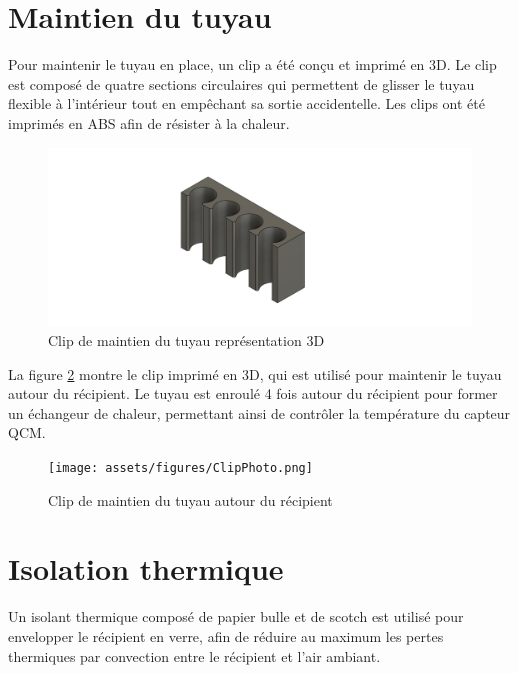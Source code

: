 \section{Maintien du tuyau}

Pour maintenir le tuyau en place, un clip a été conçu et imprimé en 3D.  
Le clip est composé de quatre sections circulaires qui permettent de glisser le tuyau flexible à l’intérieur tout en empêchant sa sortie accidentelle.  
Les clips ont été imprimés en ABS afin de résister à la chaleur.

\begin{figure}[H]
    \centering
    \includegraphics[width=\textwidth]{assets/figures/ATACHE TUBE V2.png}
    \caption{Clip de maintien du tuyau représentation 3D}
    \label{fig:Clip_tuyau}
\end{figure}

La figure \ref{fig:Clip_tuyau_photo} montre le clip imprimé en 3D, qui est utilisé pour maintenir le tuyau autour du récipient.
Le tuyau est enroulé 4 fois autour du récipient pour former un échangeur de chaleur, permettant ainsi de contrôler la température du capteur QCM.
\begin{figure}[H]
    \centering
    \texttt{[image: assets/figures/ClipPhoto.png]}
    \caption{Clip de maintien du tuyau autour du récipient}
    \label{fig:Clip_tuyau_photo}
\end{figure}
\newpage
\section{Isolation thermique}

Un isolant thermique composé de papier bulle et de scotch est utilisé pour envelopper le récipient en verre, afin de réduire au maximum les pertes thermiques par convection entre le récipient et l’air ambiant.

